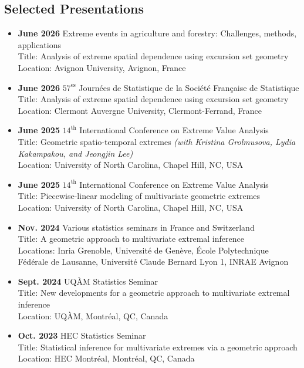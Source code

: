 \documentclass[11pt]{scrartcl}
\newcommand{\cvsection}[1]{\subsection*{#1}}
\begin{document}
\cvsection{Selected Presentations}
\begin{itemize}[leftmargin=*,nosep]
    \item \textbf{June 2026} Extreme events in agriculture and forestry: Challenges, methods, applications \\
    Title: Analysis of extreme spatial dependence using excursion set geometry \\
    Location: Avignon University, Avignon, France

    \item \textbf{June 2026} $57^{\text{es}}$ Journées de Statistique de la Société Française de Statistique \\
    Title: Analysis of extreme spatial dependence using excursion set geometry \\
    Location: Clermont Auvergne University, Clermont-Ferrand, France

    \item \textbf{June 2025} $14^{\text{th}}$ International Conference on Extreme Value Analysis \\
    Title: Geometric spatio-temporal extremes \textit{(with Kristina Grolmusova, Lydia Kakampakou, and Jeongjin Lee)} \\
    Location: University of North Carolina, Chapel Hill, NC, USA

    \item \textbf{June 2025} $14^{\text{th}}$ International Conference on Extreme Value Analysis \\
    Title: Piecewise-linear modeling of multivariate geometric extremes \\
    Location: University of North Carolina, Chapel Hill, NC, USA

    \item \textbf{Nov. 2024} Various statistics seminars in France and Switzerland \\
    Title: A geometric approach to multivariate extremal inference \\
    Locations: Inria Grenoble, Université de Genève, École Polytechnique Fédérale de Lausanne, Université Claude Bernard Lyon 1, INRAE Avignon

    \item \textbf{Sept. 2024} UQÀM Statistics Seminar \\
    Title: New developments for a geometric approach to multivariate extremal inference \\
    Location: UQÀM, Montréal, QC, Canada

    \item \textbf{Oct. 2023} HEC Statistics Seminar \\
    Title: Statistical inference for multivariate extremes via a geometric approach \\
    Location: HEC Montréal, Montréal, QC, Canada


\end{itemize}
\end{document}
